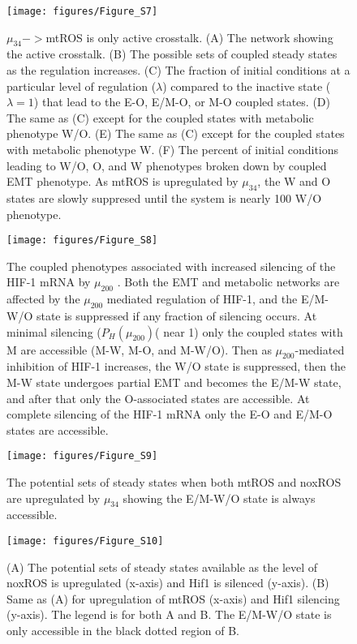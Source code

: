 \documentclass{article}
\begin{document}
\begin{figure}
\texttt{[image: figures/Figure\_S7]}
\caption{$\mu_{34}-> $mtROS is only active crosstalk. (A) The network showing the active crosstalk. (B) The possible sets of coupled steady states as the regulation increases. (C) The fraction of initial conditions at a particular level of regulation ($\lambda$) compared to the inactive state ($\lambda=1$) that lead to the E-O, E/M-O, or M-O coupled states. (D) The same as (C) except for the coupled states with metabolic phenotype W/O. (E) The same as (C) except for the coupled states with metabolic phenotype W. (F) The percent of initial conditions leading to W/O, O, and W phenotypes broken down by coupled EMT phenotype. As mtROS is upregulated by $\mu_{34}$, the W and O states are slowly suppresed until the system is nearly 100 W/O phenotype. }
\end{figure}


\begin{figure}
\texttt{[image: figures/Figure\_S8]}
\caption{The coupled phenotypes associated with increased silencing of the HIF-1 mRNA by $\mu_{200}$ . Both the EMT and metabolic networks are affected by the $\mu_{200}$ mediated regulation of HIF-1, and the E/M-W/O state is suppressed if any fraction of silencing occurs. At minimal silencing ($P_H(\mu_{200})$( near 1) only the coupled states with M are accessible (M-W, M-O, and M-W/O). Then as $\mu_{200}$-mediated inhibition of HIF-1 increases, the W/O state is suppressed, then the M-W state undergoes partial EMT and becomes the E/M-W state, and after that only the O-associated states are accessible. At complete silencing of the HIF-1 mRNA only the E-O and E/M-O states are accessible. }
\end{figure}

\begin{figure}
\texttt{[image: figures/Figure\_S9]}
\caption{The potential sets of steady states when both mtROS and noxROS are upregulated by $\mu_{34}$ showing the E/M-W/O state is always accessible. }
\end{figure}

\begin{figure}
\texttt{[image: figures/Figure\_S10]}
\caption{(A) The potential sets of steady states available as the level of noxROS is upregulated (x-axis) and Hif1 is silenced (y-axis). (B) Same as (A) for upregulation of mtROS (x-axis) and Hif1 silencing (y-axis). The legend is for both A and B. The E/M-W/O state is only accessible in the black dotted region of B. }
\end{figure} 
\end{document}
